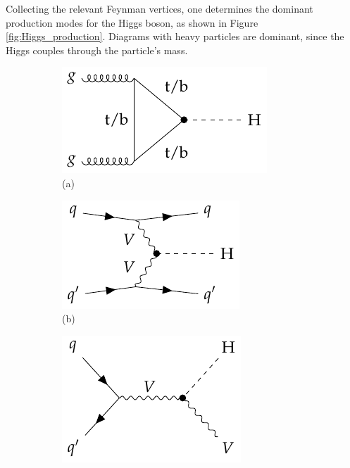 Collecting the relevant Feynman vertices, one determines the dominant production modes for the Higgs boson, as shown in Figure \ref{fig:Higgs_production}. Diagrams with heavy particles are dominant, since the Higgs couples through the particle's mass.

\begin{figure}[!ht]
    \captionsetup[subfigure]{labelformat=empty}
    \vspace*{-0.2cm}
    \centering
    \setlength{\mylength}{\textwidth}
    \begin{subfigure}[t]{0.33\mylength}
            \centering
            \includegraphics[height=0.16\mylength]{resources/H_production_diagrams/v1.pdf}
            \setlength{\unitlength}{0.25\mylength}
            \caption{\footnotesize (a)}
    \end{subfigure}%
    \begin{subfigure}[t]{0.33\mylength}
            \centering
            \includegraphics[height=0.16\mylength]{resources/H_production_diagrams/v2.pdf}
            \setlength{\unitlength}{0.25\mylength}
            \caption{\footnotesize (b)}
    \end{subfigure}%
    \begin{subfigure}[t]{0.33\mylength}
            \centering
            \includegraphics[height=0.185\mylength]{resources/H_production_diagrams/v3.pdf}

\end{subfigure}
\end{figure}
